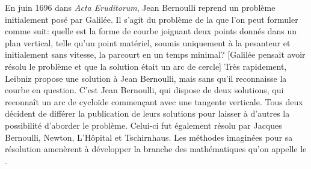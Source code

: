 \begin{histoire}
\medskip
En juin 1696 dans \emph{Acta Eruditorum}, Jean Bernoulli reprend un problème initialement posé par Galilée.
Il s'agit du problème de la  que l'on peut formuler comme suit: quelle est la forme de courbe joignant deux points donnés dans un plan vertical, telle qu'un point matériel, soumis uniquement à la pesanteur et initialement sans vitesse, la parcourt en un temps minimal? [Galilée pensait avoir résolu le problème et que la solution était un arc de cercle] Très rapidement, Leibniz propose une solution à Jean Bernoulli, mais sans qu'il reconnaisse la courbe en question. C'est Jean Bernoulli, qui dispose de deux solutions, qui reconnaît un arc de cycloïde commençant avec une tangente verticale. Tous deux décident de différer la publication de leurs solutions pour laisser à d'autres la possibilité d'aborder le problème. Celui-ci fut également résolu par Jacques Bernoulli, Newton, L'Hôpital et Tschirnhaus.
Les méthodes imaginées pour sa résolution amenèrent à développer la branche des mathématiques qu'on appelle le .


\end{histoire}
